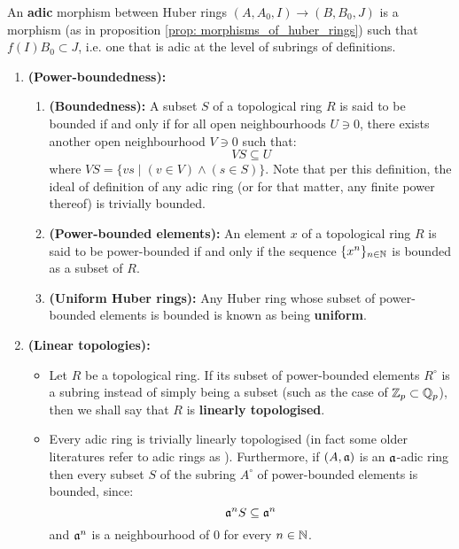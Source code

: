                 \begin{definition} \label{def: adic_morphisms}
                    An \textbf{adic} morphism between Huber rings $(A, A_0, I) \to (B, B_0, J)$ is a morphism (as in proposition \ref{prop: morphisms_of_huber_rings}) such that $f(I)B_0 \subset J$, i.e. one that is adic at the level of subrings of definitions.
                \end{definition}
                
                \begin{definition} \label{def: power_bounded_elements}
                    \noindent
                    \begin{enumerate}
                        \item \textbf{(Power-boundedness):} 
                            \begin{enumerate}
                                \item \textbf{(Boundedness):} A subset $S$ of a topological ring $R$ is said to be bounded if and only if for all open neighbourhoods $U \ni 0$, there exists another open neighbourhood $V \ni 0$ such that:
                                    $$VS \subseteq U$$
                                where $VS = \{v s \mid (v \in V) \wedge (s \in S)\}$. Note that per this definition, the ideal of definition of any adic ring (or for that matter, any finite power thereof) is trivially bounded. 
                                \item \textbf{(Power-bounded elements):} An element $x$ of a topological ring $R$ is said to be power-bounded if and only if the sequence $\{x^n\}_{n \in \mathbb{N}}$ is bounded as a subset of $R$.
                                \item \textbf{(Uniform Huber rings):} Any Huber ring whose subset of power-bounded elements is bounded is known as being \textbf{uniform}.
                            \end{enumerate}
                        \item \textbf{(Linear topologies):} 
                            \begin{itemize}
                                \item Let $R$ be a topological ring. If its subset of power-bounded elements $R^{\circ}$ is a subring instead of simply being a subset (such as the case of $\mathbb{Z}_p \subset \mathbb{Q}_p$), then we shall say that $R$ is \textbf{linearly topologised}. 
                                \item Every adic ring is trivially linearly topologised (in fact some older literatures refer to adic rings as ). Furthermore, if $(A, \mathfrak{a})$ is an $\mathfrak{a}$-adic ring then every subset $S$ of the subring $A^{\circ}$ of power-bounded elements is bounded, since:
                                    $$\mathfrak{a}^n S \subseteq \mathfrak{a}^n$$
                                and $\mathfrak{a}^n$ is a neighbourhood of $0$ for every $n \in \mathbb{N}$. 
                            \end{itemize}
                    \end{enumerate}
                \end{definition}
                
